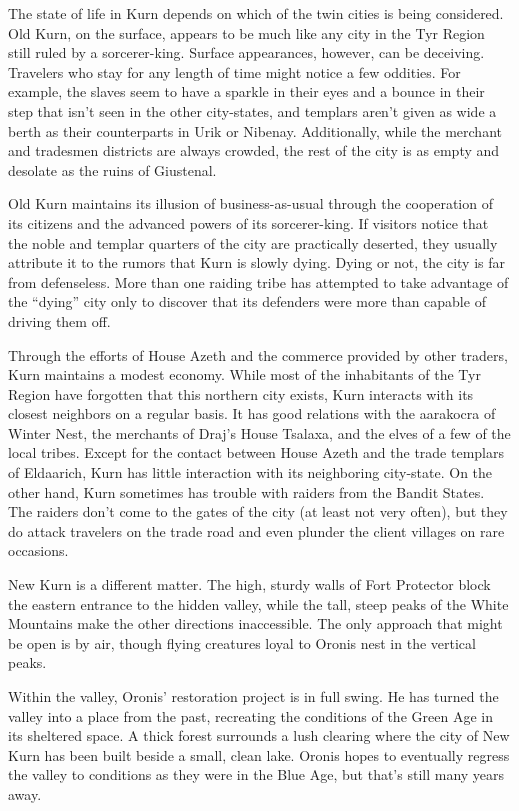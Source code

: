 {
	The state of life in Kurn depends on which of the twin cities is being considered. Old Kurn, on the surface, appears to be much like any city in the Tyr Region still ruled by a sorcerer-king. Surface appearances, however, can be deceiving. Travelers who stay for any length of time might notice a few oddities. For example, the slaves seem to have a sparkle in their eyes and a bounce in their step that isn't seen in the other city-states, and templars aren't given as wide a berth as their counterparts in Urik or Nibenay. Additionally, while the merchant and tradesmen districts are always crowded, the rest of the city is as empty and desolate as the ruins of Giustenal.

	Old Kurn maintains its illusion of business-as-usual through the cooperation of its citizens and the advanced powers of its sorcerer-king. If visitors notice that the noble and templar quarters of the city are practically deserted, they usually attribute it to the rumors that Kurn is slowly dying. Dying or not, the city is far from defenseless. More than one raiding tribe has attempted to take advantage of the ``dying'' city only to discover that its defenders were more than capable of driving them off.

	Through the efforts of House Azeth and the commerce provided by other traders, Kurn maintains a modest economy. While most of the inhabitants of the Tyr Region have forgotten that this northern city exists, Kurn interacts with its closest neighbors on a regular basis. It has good relations with the aarakocra of Winter Nest, the merchants of Draj's House Tsalaxa, and the elves of a few of the local tribes. Except for the contact between House Azeth and the trade templars of Eldaarich, Kurn has little interaction with its neighboring city-state. On the other hand, Kurn sometimes has trouble with raiders from the Bandit States. The raiders don't come to the gates of the city (at least not very often), but they do attack travelers on the trade road and even plunder the client villages on rare occasions.

	New Kurn is a different matter. The high, sturdy walls of Fort Protector block the eastern entrance to the hidden valley, while the tall, steep peaks of the White Mountains make the other directions inaccessible. The only approach that might be open is by air, though flying creatures loyal to Oronis nest in the vertical peaks.

	Within the valley, Oronis' restoration project is in full swing. He has turned the valley into a place from the past, recreating the conditions of the Green Age in its sheltered space. A thick forest surrounds a lush clearing where the city of New Kurn has been built beside a small, clean lake. Oronis hopes to eventually regress the valley to conditions as they were in the Blue Age, but that's still many years away.

}
